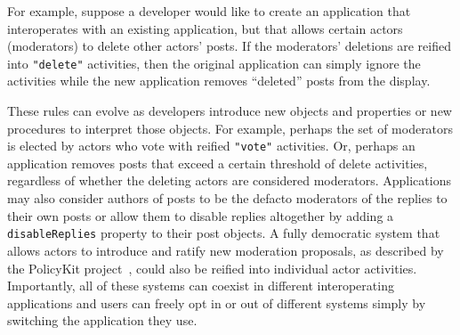 
For example, suppose a developer would like to create an application
that interoperates with an existing application,
but that allows certain actors (moderators) to delete other actors' posts.
If the moderators' deletions are reified into \texttt{"delete"} activities,
then the original application can simply ignore the activities
while the new application removes ``deleted'' posts from the display.

These rules can evolve as developers
introduce new objects and properties
or new procedures to interpret those objects.
For example,
perhaps the set of moderators is elected by actors who vote with reified \texttt{"vote"} activities.
Or, perhaps an application removes posts that exceed a certain threshold of delete activities,
regardless of whether the deleting actors are considered moderators.
Applications may also consider authors of posts to be the defacto moderators of the replies to their
own posts or allow them to disable replies altogether by adding a \texttt{disableReplies}
property to their post objects.
A fully democratic system that allows actors to introduce and ratify new moderation proposals,
as described by the PolicyKit project~\cite{policykit}, could also be reified into
individual actor activities.
Importantly, all of these systems can coexist in different interoperating
applications and users can freely opt in or out of different systems simply by switching
the application they use.




